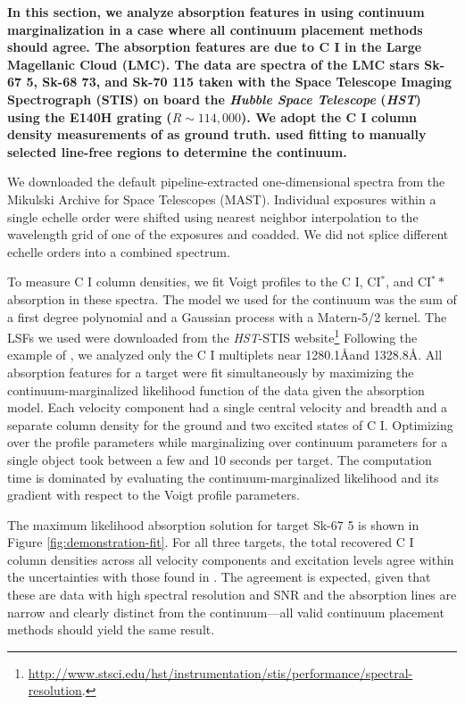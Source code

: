 \documentclass[trackchanges]{aastex62}
\begin{document}
{\color{red} \bf
In this section, we analyze absorption features in using continuum marginalization in a case where all continuum placement methods should agree.
The absorption features are due to {C \small{I}} in the Large Magellanic Cloud (LMC).
The data are spectra of the LMC stars Sk-67 5, Sk-68 73, and Sk-70 115 taken with the Space Telescope Imaging Spectrograph (STIS) \citep{1998PASP..110.1183W} on board the \emph{Hubble Space Telescope} (\emph{HST}) using the E140H grating ($R \sim 114,000$).
We adopt the {C \small{I}} column density measurements of \citet{Welty:2016} as ground truth.
\citet{Welty:2016} used fitting to manually selected line-free regions to determine the continuum.

We downloaded the default pipeline-extracted one-dimensional spectra from the Mikulski Archive for Space Telescopes (MAST).
Individual exposures within a single echelle order were shifted using nearest neighbor interpolation to the wavelength grid of one of the exposures and coadded.
We did not splice different echelle orders into a combined spectrum.

To measure {C \small{I}} column densities, we fit Voigt profiles to the {C \small{I}}, C\small{I}$^*$, and C\small{I}$^**$ absorption in these spectra.
The model we used for the continuum was the sum of a first degree polynomial and a Gaussian process with a Matern-5/2 kernel.
The LSFs we used were downloaded from the \emph{HST}-STIS website\footnote{\url{http://www.stsci.edu/hst/instrumentation/stis/performance/spectral-resolution}.}
Following the example of \citet{Welty:2016}, we analyzed only the {C \small{I}} multiplets near 1280.1\AA and 1328.8\AA.
All absorption features for a target were fit simultaneously by maximizing the continuum-marginalized likelihood function of the data given the absorption model.
Each velocity component had a single central velocity and breadth and a separate column density for the ground and two excited states of {C \small{I}}.
Optimizing over the profile parameters while marginalizing over continuum parameters for a single object took between a few and 10 seconds per target.
The computation time is dominated by evaluating the continuum-marginalized likelihood and its gradient with respect to the Voigt profile parameters.

The maximum likelihood absorption solution for target Sk-67 5 is shown in Figure \ref{fig:demonstration-fit}.
For all three targets, the total recovered {C \small{I}} column densities across all velocity components and excitation levels agree within the uncertainties with those found in \citet{Welty:2016}.
The agreement is expected, given that these are data with high spectral resolution and SNR and the absorption lines are narrow and clearly distinct from the continuum---all valid continuum placement methods should yield the same result.

}
\end{document}
